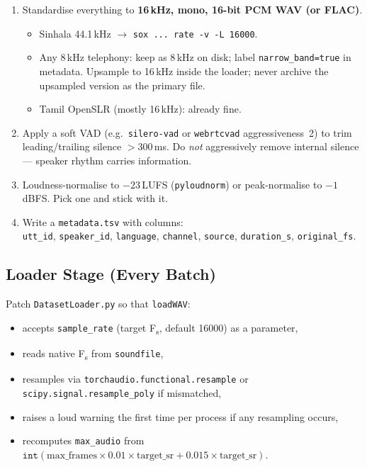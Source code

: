 \documentclass[11pt,a4paper]{article}
\begin{document}
\begin{enumerate}
  \item Standardise everything to \textbf{16\,kHz, mono, 16-bit PCM WAV (or FLAC)}.
  \begin{itemize}
    \item Sinhala 44.1\,kHz $\to$ \verb|sox ... rate -v -L 16000|.
    \item Any 8\,kHz telephony: keep as 8\,kHz on disk; label \texttt{narrow\_band=true} in
      metadata. Upsample to 16\,kHz inside the loader; never archive the upsampled version as the
      primary file.
    \item Tamil OpenSLR (mostly 16\,kHz): already fine.
  \end{itemize}
  \item Apply a soft VAD (e.g.\ \texttt{silero-vad} or \texttt{webrtcvad} aggressiveness~2) to trim
    leading/trailing silence $>300$\,ms. Do \emph{not} aggressively remove internal silence ---
    speaker rhythm carries information.
  \item Loudness-normalise to $-23$\,LUFS (\texttt{pyloudnorm}) or peak-normalise to $-1$\,dBFS.
    Pick one and stick with it.
  \item Write a \texttt{metadata.tsv} with columns:\\
    \texttt{utt\_id}, \texttt{speaker\_id}, \texttt{language}, \texttt{channel},
    \texttt{source}, \texttt{duration\_s}, \texttt{original\_fs}.
\end{enumerate}

\subsection{Loader Stage (Every Batch)}

Patch \texttt{DatasetLoader.py} so that \texttt{loadWAV}:
\begin{itemize}
  \item accepts \texttt{sample\_rate} (target F\textsubscript{s}, default 16000) as a parameter,
  \item reads native F\textsubscript{s} from \texttt{soundfile},
  \item resamples via \texttt{torchaudio.functional.resample} or
    \texttt{scipy.signal.resample\_poly} if mismatched,
  \item raises a loud warning the first time per process if any resampling occurs,
  \item recomputes \texttt{max\_audio} from
    $\texttt{int}(\text{max\_frames} \times 0.01 \times \text{target\_sr} + 0.015 \times \text{target\_sr})$.
\end{itemize}
\end{document}

